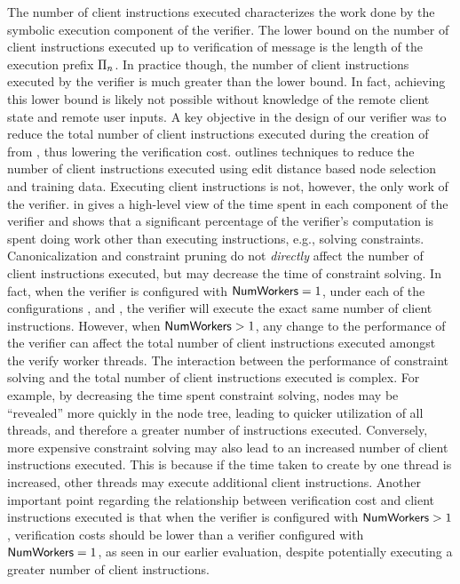 The number of client instructions executed characterizes the work done
by the symbolic execution component of the verifier. The lower bound
on the number of client instructions executed up to verification of
message \msgNmbr is the length of the execution prefix
$\Pi_{n}$. In practice though, the number of client
instructions executed by the verifier is much greater than the lower
bound. In fact, achieving this lower bound is likely not possible
without knowledge of the remote client state and remote user inputs.
A key objective in the design of our verifier was to reduce the total
number of client instructions executed during the creation of
\execPrefix{\msgNmbr} from , thus lowering the
verification cost.  outlines techniques to reduce the
number of client instructions executed using edit distance based node
selection and training data. Executing client instructions is not,
however, the only work of the verifier.  in
 gives a high-level view of the time spent in each
component of the verifier and shows that a significant percentage of
the verifier's computation is spent doing work other than executing
instructions, e.g., solving constraints. Canonicalization and
constraint pruning do not \emph{directly} affect the number of client
instructions executed, but may decrease the time of constraint
solving. In fact, when the verifier is configured with $\mathsf{NumWorkers} =
1$, under each of the configurations \allopt, \nocanon and \noprune,
the verifier will execute the exact same number of client
instructions. However, when $\mathsf{NumWorkers} > 1$, any change to the
performance of the verifier can affect the total number of client
instructions executed amongst the verify worker threads. The
interaction between the performance of constraint solving and the
total number of client instructions executed is complex. For example,
by decreasing the time spent constraint solving, nodes may be
``revealed'' more quickly in the node tree, leading to quicker
utilization of all \verifyWorker threads, and therefore a greater
number of instructions executed. Conversely, more expensive constraint
solving may also lead to an increased number of client instructions
executed. This is because if the time taken to create
\execPrefix{\msgNmbr} by one \verifyWorker thread is increased, other
\verifyWorker threads may execute additional client instructions.
Another important point regarding the relationship between
verification cost and client instructions executed is that when the
verifier is configured with $\mathsf{NumWorkers} > 1$, verification costs
should be lower than a verifier configured with $\mathsf{NumWorkers}  = 1$,
as seen in our earlier evaluation, despite potentially executing a
greater number of client instructions.

